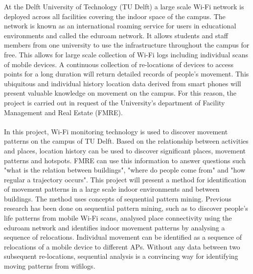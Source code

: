 At the Delft University of Technology (TU Delft) a large scale Wi-Fi network is deployed across all facilities covering the indoor space of the campus. The network is known as an international roaming service for users in educational environments and called the eduroam network. It allows students and staff members from one university to use the infrastructure throughout the campus for free. This allows for large scale collection of Wi-Fi logs including individual scans of mobile devices.  A continuous collection of re-locations of devices to access points for a long duration will return detailed records of people’s movement. This ubiquitous and individual history location data derived from smart phones will present valuable knowledge on movement on the campus. For this reason, the project is carried out in request of the University's department of Facility Management and Real Estate (FMRE).\\\\
In this project, Wi-Fi monitoring technology is used to discover movement
patterns on the campus of TU Delft. Based on the relationship between activities and places, location history can be used to discover significant places, movement patterns and hotspots. FMRE can use this information to answer questions such "what is the relation between buildings", "where do people come from" and "how regular a trajectory occurs". This project will present a method for identification of movement patterns in a large scale indoor environments and between buildings. The method uses concepts of sequential pattern mining. Previous research has been done on sequential pattern mining, such as \cite{zhao2014discovering} to discover people’s life patterns from mobile Wi-Fi scans, \cite{meneses2012large} analysed place connectivity using the eduroam network and \cite{radaelli2013identifying} identifies indoor movement patterns by analysing a sequence of relocations. Individual movement can be identified as a sequence of relocations of a mobile device to different APs. Without any data between two subsequent re-locations, sequential analysis is a convincing way for identifying moving patterns from wifilogs.
